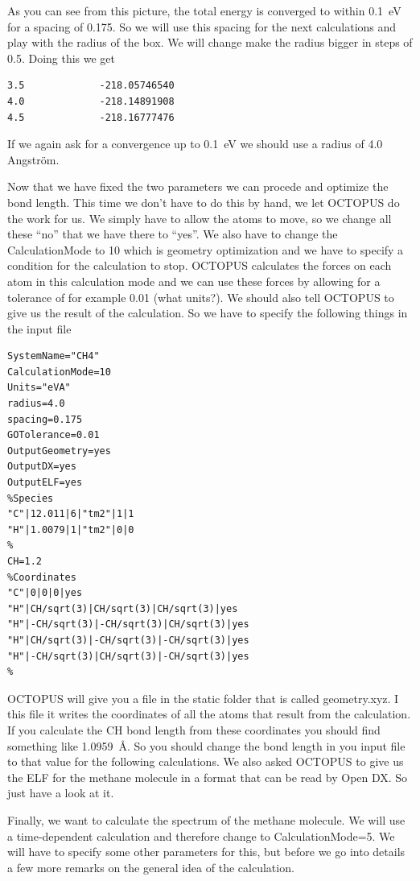 \documentclass{article}
\begin{document}
As you can see from this picture, the total energy is converged to within 0.1~eV
for a spacing of 0.175. So we will use this spacing for the next calculations
and play with the radius of the box. We will change make the radius bigger in
steps of 0.5. Doing this we get

\begin{verbatim}
3.5             -218.05746540
4.0             -218.14891908
4.5             -218.16777476
\end{verbatim}

If we again ask for a convergence up to 0.1~eV we should use a radius of 4.0
Angstr\"om. 

Now that we have fixed the two parameters we can procede and optimize the bond
length. This time we don't have to do this by hand, we let OCTOPUS do the work
for us. We simply have to allow the atoms to move, so we change all these ``no''
that we have there to ``yes''. We also have to change the CalculationMode to 10
which is geometry optimization and we have to specify a condition for the
calculation to stop. OCTOPUS calculates the forces on each atom in this
calculation mode and we can use these forces by allowing for a tolerance of for
example 0.01 (what units?). We should also tell OCTOPUS to give us the result of
the calculation. So we have to specify the following things in the input file

\begin{verbatim}
SystemName="CH4"
CalculationMode=10
Units="eVA"
radius=4.0
spacing=0.175
GOTolerance=0.01
OutputGeometry=yes
OutputDX=yes
OutputELF=yes
%Species
"C"|12.011|6|"tm2"|1|1
"H"|1.0079|1|"tm2"|0|0
%
CH=1.2
%Coordinates
"C"|0|0|0|yes
"H"|CH/sqrt(3)|CH/sqrt(3)|CH/sqrt(3)|yes
"H"|-CH/sqrt(3)|-CH/sqrt(3)|CH/sqrt(3)|yes
"H"|CH/sqrt(3)|-CH/sqrt(3)|-CH/sqrt(3)|yes
"H"|-CH/sqrt(3)|CH/sqrt(3)|-CH/sqrt(3)|yes
%
\end{verbatim}

OCTOPUS will give you a file in the static folder that is called geometry.xyz.
I this file it writes the coordinates of all the atoms that result from the
calculation. If you calculate the CH bond length from these coordinates you
should find something like 1.0959~\AA. So you should change the bond
length in you input file to that value for the following calculations. We also
asked OCTOPUS to give us the ELF for the methane molecule in a format that can
be read by Open DX. So just have a look at it. 

Finally, we want to calculate the spectrum of the methane molecule. We will use
a time-dependent calculation and therefore change to CalculationMode=5. We will
have to specify some other parameters for this, but before we go into details a
few more remarks on the general idea of the calculation.
\end{document}
